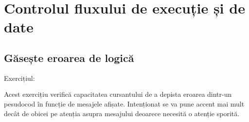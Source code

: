 \chapter{Controlul fluxului de execuție și de date}

\section{Găsește eroarea de logică}

Exercițiul:



Acest exercițiu verifică capacitatea cursantului de a depista eroarea dintr-un
pesudocod în funcție de mesajele afișate. Intenționat se va pune accent mai
mult decât de obicei pe atenția asupra mesajului deoarece necesită o atenție
sporită.


